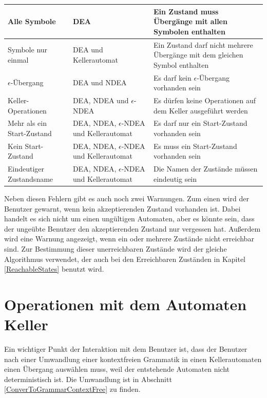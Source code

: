 \noindent
\begin{tabular}{|p{2.1cm}|p{2.7cm}|p{6.0cm}|}
  \hline
  Alle Symbole &
  DEA &
  Ein Zustand muss Übergänge mit allen Symbolen enthalten \\
  \hline
  Symbole nur einmal &
  DEA und Kellerautomat &
  Ein Zustand darf nicht mehrere Übergänge mit dem gleichen Symbol enthalten \\
  \hline
  $\epsilon$-Übergang &
  DEA und NDEA &
  Es darf kein $\epsilon$-Übergang vorhanden sein \\
  \hline
  Keller-Operationen &
  DEA, NDEA und $\epsilon$-NDEA &
  Es dürfen keine Operationen auf dem Keller ausgeführt werden \\
  \hline
  Mehr als ein Start-Zustand &
  DEA, NDEA, $\epsilon$-NDEA und Kellerautomat&
  Es darf nur ein Start-Zustand vorhanden sein \\
  \hline
  Kein Start-Zustand &
  DEA, NDEA, $\epsilon$-NDEA und Kellerautomat&
  Es muss ein Start-Zustand vorhanden sein \\
  \hline
  Eindeutiger Zustandsname &
  DEA, NDEA, $\epsilon$-NDEA und Kellerautomat&
  Die Namen der Zustände müssen eindeutig sein \\
  \hline
\end{tabular}
\vspace{10pt}

\noindent
Neben diesen Fehlern gibt es auch noch zwei Warnungen. Zum einen wird der
Benutzer gewarnt, wenn kein akzeptierenden Zustand vorhanden ist. Dabei handelt
es sich nicht um einen ungültigen Automaten, aber es könnte sein, dass der
ungeübte Benutzer den akzeptierenden Zustand nur vergessen hat. Außerdem wird
eine Warnung angezeigt, wenn ein oder mehrere Zustände nicht erreichbar sind.
Zur Bestimmung dieser unerreichbaren Zustände wird der gleiche Algorithmus
verwendet, der auch bei den Erreichbaren Zuständen in Kapitel
\ref{ReachableStates} benutzt wird.


\section{Operationen mit dem Automaten Keller}\label{InteractionPDA}

Ein wichtiger Punkt der Interaktion mit dem Benutzer ist, dass der Benutzer
nach einer Umwandlung einer kontextfreien Grammatik in einen Kellerautomaten
einen Übergang auswählen muss, weil der entstehende Automaten nicht
deterministisch ist. Die Umwandlung ist in Abschnitt
\ref{ConverToGrammarContextFree} zu finden.\vspace{10pt}

